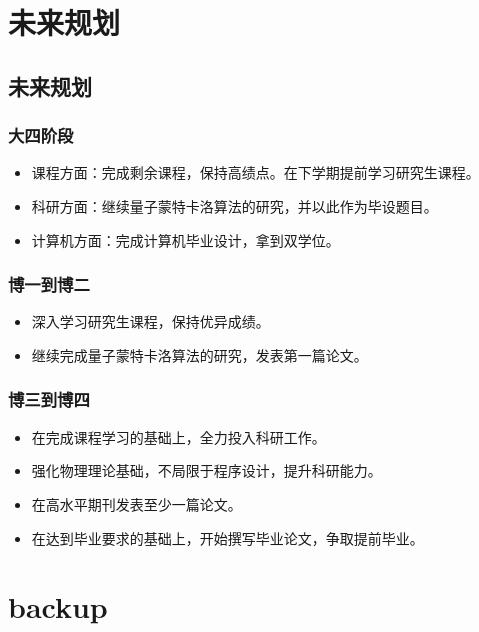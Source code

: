 \documentclass[12pt,aspectratio=169,UTF8]{beamer}
\begin{document}
\section{未来规划}
\subsection{未来规划}
\begin{frame}
  \frametitle{大四阶段}
  \begin{itemize}
    \item 课程方面：完成剩余课程，保持高绩点。在下学期提前学习研究生课程。
    \item 科研方面：继续量子蒙特卡洛算法的研究，并以此作为毕设题目。
    \item 计算机方面：完成计算机毕业设计，拿到双学位。
  \end{itemize}
\end{frame}

\begin{frame}
  \frametitle{博一到博二}
  \begin{itemize}
    \item 深入学习研究生课程，保持优异成绩。
    \item 继续完成量子蒙特卡洛算法的研究，发表第一篇论文。
  \end{itemize}
\end{frame}

\begin{frame}
  \frametitle{博三到博四}
  \begin{itemize}
    \item 在完成课程学习的基础上，全力投入科研工作。
    \item 强化物理理论基础，不局限于程序设计，提升科研能力。
    \item 在高水平期刊发表至少一篇论文。
    \item 在达到毕业要求的基础上，开始撰写毕业论文，争取提前毕业。
  \end{itemize}
\end{frame}

\appendix

\section*{backup}
\end{document}
